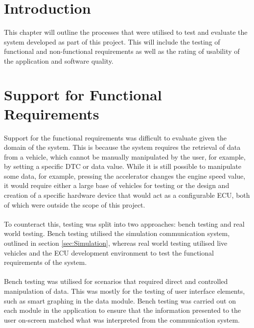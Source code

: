 \section{Introduction}
	\paragraph{}{
	This chapter will outline the processes that were utilised to test and evaluate the system developed as part of this project. This will include the testing of functional and non-functional requirements as well as the rating of usability of the application and software quality.
	}
	
\section{Support for Functional Requirements}
	\paragraph{}{
	Support for the functional requirements was difficult to evaluate given the domain of the system. This is because the system requires the retrieval of data from a vehicle, which cannot be manually manipulated by the user, for example, by setting a specific DTC or data value. While it is still possible to manipulate some data, for example, pressing the accelerator changes the engine speed value, it would require either a large base of vehicles for testing or the design and creation of a specific hardware device that would act as a configurable ECU, both of which were outside the scope of this project.
	}

	\paragraph{}{
	To counteract this, testing was split into two approaches: bench testing and real world testing. Bench testing utilised the simulation communication system, outlined in section \ref{sec:Simulation}, whereas real world testing utilised live vehicles and the ECU development environment to test the functional requirements of the system. 
	}
	
	\paragraph{}{
	Bench testing was utilised for scenarios that required direct and controlled manipulation of data. This was mostly for the testing of user interface elements, such as smart graphing in the data module. Bench testing was carried out on each module in the application to ensure that the information presented to the user on-screen matched what was interpreted from the communication system. 
	}
	
